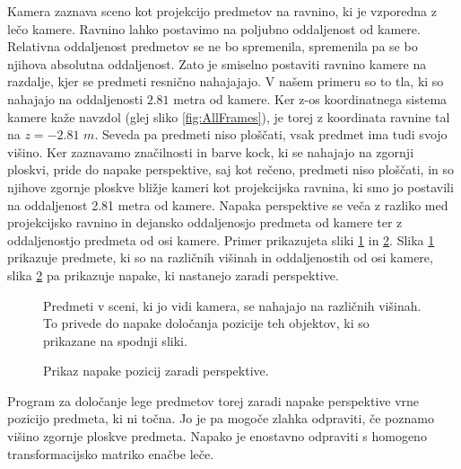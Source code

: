 Kamera zaznava sceno kot projekcijo predmetov na ravnino, ki je vzporedna z lečo kamere. Ravnino lahko postavimo na poljubno oddaljenost od kamere. Relativna oddaljenost predmetov se ne bo spremenila, spremenila pa se bo njihova absolutna oddaljenost. Zato je smiselno postaviti ravnino kamere na razdalje, kjer se predmeti resnično nahajajajo. V našem primeru so to tla, ki so nahajajo na oddaljenosti $2.81$ metra od kamere. Ker z-os koordinatnega sistema kamere kaže navzdol (glej sliko \ref{fig:AllFrames}), je torej z koordinata ravnine tal na $z=-2.81$ $m$. Seveda pa predmeti niso ploščati, vsak predmet ima tudi svojo višino. Ker zaznavamo značilnosti in barve kock, ki se nahajajo na zgornji ploskvi, pride do napake perspektive, saj kot rečeno, predmeti niso ploščati, in so njihove zgornje ploskve bližje kameri kot projekcijska ravnina, ki smo jo postavili na oddaljenost 2.81 metra od kamere. Napaka perspektive se veča z razliko med projekcijsko ravnino in dejansko oddaljenosjo predmeta od kamere ter z oddaljenostjo predmeta od osi kamere. Primer prikazujeta sliki \ref{fig:PredmetiPerspektiva} in \ref{fig:NapakaPerspektive}. Slika \ref{fig:PredmetiPerspektiva} prikazuje predmete, ki so na različnih višinah in oddaljenostih od osi kamere, slika \ref{fig:NapakaPerspektive} pa prikazuje napake, ki nastanejo zaradi perspektive.

\begin{figure}[h]
\centering {}
\caption{Predmeti v sceni, ki jo vidi kamera, se nahajajo na različnih višinah. To privede do napake določanja pozicije teh objektov, ki so prikazane na spodnji sliki.}
\label{fig:PredmetiPerspektiva}
\end{figure}

\begin{figure}[h]
\centering {}
\caption{Prikaz napake pozicij zaradi perspektive.}
\label{fig:NapakaPerspektive}
\end{figure}

Program za določanje lege predmetov torej zaradi napake perspektive vrne pozicijo predmeta, ki ni točna. Jo je pa mogoče zlahka odpraviti, če poznamo višino zgornje ploskve predmeta. Napako je enostavno odpraviti s homogeno transformacijsko matriko enačbe leče.


